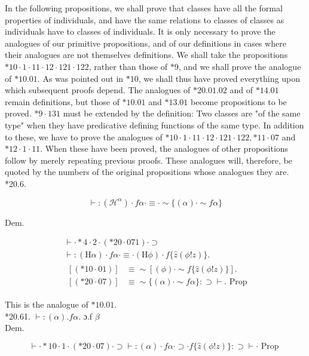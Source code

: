 \documentclass[10pt]{article}
\begin{document}
In the following propositions, we shall prove that classes have all the formal properties of individuals, and have the same relations to classes of classes as individuals have to classes of individuals. It is only necessary to prove the analogues of our primitive propositions, and of our definitions in cases where their analogues are not themselves definitions. We shall take the propositions $* 10 \cdot 1 \cdot 11 \cdot 12 \cdot 121 \cdot 122$, rather than those of $* 9$, and we shall prove the analogue of $* 10.01$. As was pointed out in $* 10$, we shall thus have proved everything upon which subsequent proofs depend. The analogues of $* 20.01 .02$ and of $* 14.01$ remain definitions, but those of $* 10.01$ and $* 13.01$ become propositions to be proved. $* 9 \cdot 131$ must be extended by the definition: Two classes are "of the same type" when they have predicative defining functions of the same type. In addition to these, we have to prove the analogues of $* 10 \cdot 1 \cdot 11 \cdot 12 \cdot 121 \cdot 122, * 11 \cdot 07$ and $* 12 \cdot 1 \cdot 11$. When these have been proved, the analogues of other propositions follow by merely repeating previous proofs. These analogues will, therefore, be quoted by the numbers of the original propositions whose analogues they are.\\
*20.6.

$$
\vdash:\left(\mathcal{H}^{\alpha}\right) \cdot f \alpha \cdot \equiv \cdot \sim\{(\alpha) \cdot \sim f \alpha\}
$$

Dem.

$$
\begin{aligned}
& \vdash \cdot * 4 \cdot 2 \cdot(* 20 \cdot 071) \cdot \supset \\
& \vdash:(\mathrm{H} \alpha) \cdot f \alpha \cdot \equiv \cdot(\mathrm{H} \phi) \cdot f\{\hat{z}(\phi!z)\} . \\
& \begin{array}{ll}
{[(* 10 \cdot 01)]} & \equiv \sim[(\phi) \cdot \sim f\{\hat{z}(\phi!z)\}] . \\
{[(* 20 \cdot 07)]} & \equiv \sim\{(\alpha) \cdot \sim f \alpha\}: \supset \vdash . \text { Prop }
\end{array}
\end{aligned}
$$

This is the analogue of $* 10.01$.\\
*20.61. $\vdash:(\alpha) . f \alpha$. ɔ.f $\beta$\\
Dem.

$$
\vdash \cdot * 10 \cdot 1 \cdot(* 20 \cdot 07) \cdot \supset \vdash:(\alpha) \cdot f \alpha \cdot \supset \cdot f\{\hat{z}(\phi!z)\}: \supset \vdash \cdot \text { Prop }
$$
\end{document}
